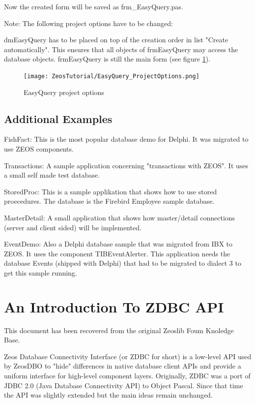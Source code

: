 \documentclass[a4paper,12pt,oneside]{book}
\begin{document}
Now the created form will be saved as frm\_EasyQuery.pas.

Note: The following project options have to be changed:

dmEasyQuery has to be placed on top of the creation order in list "Create automatically".
This ensures that all objects of frmEasyQuery may access the database objects.
frmEasyQuery is still the main form (see figure \ref{fig:EasyQuery_ProjectOptions}).
	
\begin{figure}[htbp] 
  \centering
  \texttt{[image: ZeosTutorial/EasyQuery\_ProjectOptions.png]}
  \caption{EasyQuery project options}
  \label{fig:EasyQuery_ProjectOptions}
\end{figure}

\section{Additional Examples}
FishFact:
This is the most popular database demo for Delphi. It was migrated to use ZEOS components.

Transactions:
A sample application concerning "transactions with ZEOS". It uses a small self made test database.

StoredProc:
This is a sample applikation that shows how to use stored proecedures. The database is the Firebird
Employee sample database.

MasterDetail:
A small application that shows how master/detail connections (server and client sided) will be implemented.

EventDemo:
Also a Delphi database sample that was migrated from IBX to ZEOS.
It uses the component TIBEventAlerter.
This application needs the database Events (shipped with Delphi) that had to be migrated to dialect 3 to get this sample running.

\chapter{An Introduction To ZDBC API}
This document has been recovered from the original Zeoslib Foum Knoledge Base.

Zeos Database Connectivity Interface (or ZDBC for short) is a low-level API used by ZeosDBO to "hide" differences in native database client APIs and provide a uniform interface for high-level component layers. Originally, ZDBC was a port of JDBC 2.0 (Java Database Connectivity API) to Object Pascal. Since that time the API was slightly extended but the main ideas remain unchanged.
\end{document}
